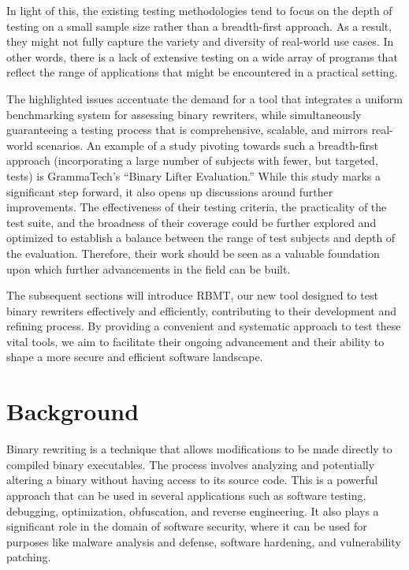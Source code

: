 \documentclass[a4paper,11pt,oneside]{report}
\begin{document}
In light of this, the existing testing methodologies tend to focus on the depth of
testing on a small sample size rather than a breadth-first approach. As a result, they might
not fully capture the variety and diversity of real-world use cases. In other words, there is a
lack of extensive testing on a wide array of programs that reflect the range of applications
that might be encountered in a practical setting.

The highlighted issues accentuate the demand for a tool that integrates a uniform
benchmarking system for assessing binary rewriters, while simultaneously guaranteeing a
testing process that is comprehensive, scalable, and mirrors real-world scenarios. An
example of a study pivoting towards such a breadth-first approach (incorporating a large
number of subjects with fewer, but targeted, tests) is GrammaTech’s “Binary Lifter
Evaluation.” While this study marks a significant step forward, it also opens up discussions
around further improvements. The effectiveness of their testing criteria, the practicality of
the test suite, and the broadness of their coverage could be further explored and optimized
to establish a balance between the range of test subjects and depth of the evaluation.
Therefore, their work should be seen as a valuable foundation upon which further
advancements in the field can be built.

The subsequent sections will introduce RBMT, our new tool designed to test binary
rewriters effectively and efficiently, contributing to their development and refining process.
By providing a convenient and systematic approach to test these vital tools, we aim to
facilitate their ongoing advancement and their ability to shape a more secure and efficient
software landscape.

\chapter{Background}
\setlength{\parindent}{4em}
Binary rewriting is a technique that allows modifications to be made directly to
compiled binary executables. The process involves analyzing and potentially altering a
binary without having access to its source code. This is a powerful approach that can be
used in several applications such as software testing, debugging, optimization, obfuscation,
and reverse engineering. It also plays a significant role in the domain of software security,
where it can be used for purposes like malware analysis and defense, software hardening,
and vulnerability patching.
\end{document}
